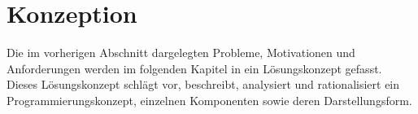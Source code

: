 \chapter{Konzeption}\label{chapter:konzeption}
Die im vorherigen Abschnitt dargelegten Probleme, Motivationen und Anforderungen werden im folgenden Kapitel in ein Lösungskonzept gefasst. Dieses Lösungskonzept schlägt vor, beschreibt, analysiert und rationalisiert ein Programmierungskonzept, einzelnen Komponenten sowie deren Darstellungsform.





